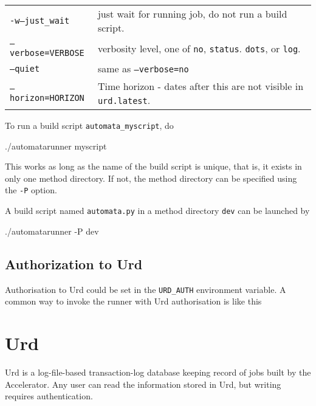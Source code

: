 \begin{snugshade}
\begin{tabular}{p{4cm}p{9cm}}
  \texttt{-w}\hspace{3cm}\texttt{---just\_wait} & just wait for running
  job, do not run a build script.\\[4ex]

  \texttt{---verbose=VERBOSE} & verbosity level, one of \texttt{no},
  \texttt{status}. \texttt{dots}, or \texttt{log}.\\[2ex]

  \texttt{---quiet} & same as \texttt{---verbose=no}\\[2ex]

  \texttt{---horizon=HORIZON} & Time horizon - dates after this are
  not visible in \texttt{urd.latest}.\\[4ex]
\end{tabular}
\end{snugshade}
To run a build script \texttt{automata\_myscript}, do
\begin{python}
./automatarunner myscript
\end{python}
This works as long as the name of the build script is unique, that is,
it exists in only one method directory.  If not, the method directory
can be specified using the \texttt{-P} option.

A build script named \texttt{automata.py} in a method
directory \texttt{dev} can be launched by
\begin{python}
./automatarunner -P dev
\end{python}



\subsection{Authorization to Urd}
Authorisation to Urd could be set in the \texttt{URD\_AUTH}
environment variable.  A common way to invoke the runner with Urd
authorisation is like this
\begin{shell}
\end{shell}





\clearpage

\section{Urd}

Urd is a log-file-based transaction-log database keeping record of
jobs built by the Accelerator.  Any user can read the information
stored in Urd, but writing requires authentication.


